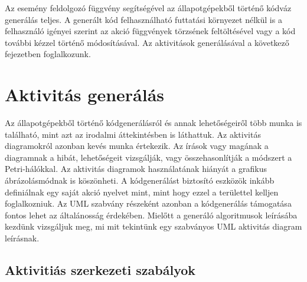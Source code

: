 \documentclass[a4paper,12pt]{report}
\begin{document}
Az esemény feldolgozó függvény segítségével az állapotgépekből történő kódváz generálás teljes. A generált kód felhasználható futtatási környezet nélkül is a felhasználó igényei szerint az akció függvények törzsének feltöltésével vagy a kód további kézzel történő módosításával.
Az aktivitások generálásával a következő fejezetben foglalkozunk.

\section{Aktivitás generálás}

Az állapotgépekből történő kódgenerálásról és annak lehetőségeiről több munka is található, mint azt az irodalmi áttekintésben is láthattuk. Az aktivitás diagramokról azonban kevés munka értekezik. Az írások vagy magának a diagramnak a hibát, lehetőségeit vizsgálják, vagy összehasonlítják a módszert a Petri-hálókkal\cite{murata1989petri}. Az aktivitás diagramok használatának hiányát a grafikus ábrázolásmódnak is köszönheti. A kódgenerálást biztosító eszközök inkább definiálnak egy saját akció nyelvet mint, mint hogy ezzel a területtel kelljen foglalkozniuk. Az UML szabvány részeként azonban a kódgenerálás támogatása fontos lehet az általánosság érdekében. Mielőtt a generáló algoritmusok leírásába kezdünk vizsgáljuk meg, mi mit tekintünk egy szabványos UML aktivitás diagram leírásnak.

\subsection{Aktivitiás szerkezeti szabályok}
\end{document}
